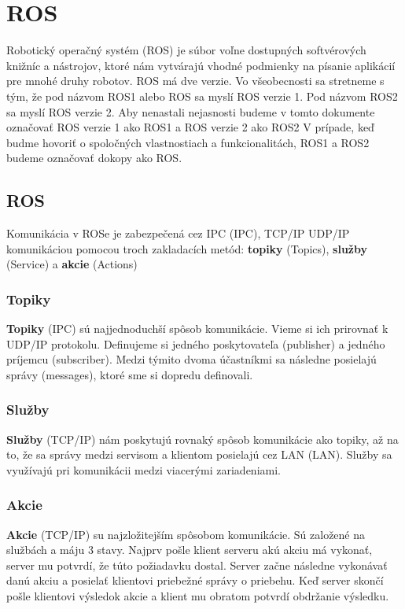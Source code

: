 \section{ROS}
\noindent Robotický operačný systém (\acrlong{ROS}) je súbor voľne dostupných softvérových knižníc a nástrojov, ktoré nám vytvárajú
vhodné podmienky na písanie aplikácií pre mnohé druhy robotov. ROS má dve verzie. Vo všeobecnosti sa stretneme s tým, že pod názvom
ROS1 alebo ROS sa myslí ROS verzie 1. Pod názvom ROS2 sa myslí ROS verzie 2. Aby nenastali nejasnosti budeme v tomto dokumente
označovať ROS verzie 1 ako ROS1 a ROS verzie 2 ako ROS2 V prípade, keď budme hovoriť o spoločných vlastnostiach a funkcionalitách,
ROS1 a ROS2 budeme označovať dokopy ako ROS.

\subsection{ROS}

\noindent Komunikácia v ROSe je zabezpečená cez IPC (\acrlong{IPC}), TCP/IP UDP/IP komunikáciou pomocou troch zakladacích metód:
\textbf{topiky} (Topics), \textbf{služby} (Service) a \textbf{akcie} (Actions)

\subsubsection{Topiky}

\textbf {Topiky} (IPC) sú najjednoduchší spôsob komunikácie. Vieme si ich prirovnať k UDP/IP protokolu. Definujeme si jedného poskytovateľa (publisher)
a jedného príjemcu (subscriber). Medzi týmito dvoma účastníkmi sa následne posielajú správy (messages), ktoré sme si dopredu definovali.

\subsubsection{Služby}

\textbf {Služby} (TCP/IP) nám poskytujú rovnaký spôsob komunikácie ako topiky, až na to, že sa správy medzi servisom a klientom posielajú
cez LAN (\acrlong{LAN}). Služby sa využívajú pri komunikácii medzi viacerými zariadeniami.

\subsubsection{Akcie}

\textbf {Akcie} (TCP/IP) su najzložitejším spôsobom komunikácie. Sú založené na službách a máju 3 stavy. Najprv pošle klient serveru akú akciu
má vykonať, server mu potvrdí, že túto požiadavku dostal. Server začne následne vykonávať danú akciu a posielať klientovi priebežné správy o priebehu.
Keď server skončí pošle klientovi výsledok akcie a klient mu obratom potvrdí obdržanie výsledku.

